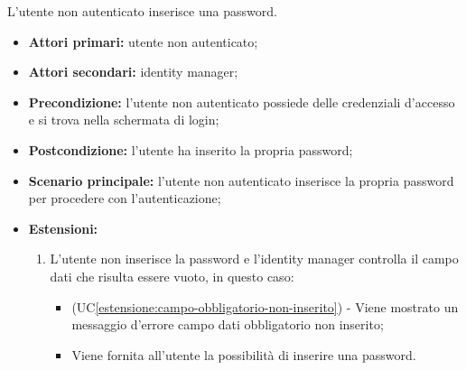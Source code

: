 \label{autenticazione-venditore.modulo.password}

L'utente non autenticato inserisce una password.
\begin{itemize}
	\item \textbf{Attori primari:} utente non autenticato;
	\item \textbf{Attori secondari:} identity manager;
	\item \textbf{Precondizione:} l'utente non autenticato possiede delle credenziali d'accesso e si trova nella schermata di login;
	\item \textbf{Postcondizione:} l'utente ha inserito la propria password;
	\item \textbf{Scenario principale:} l'utente non autenticato inserisce la propria password per procedere con l'autenticazione;
	\item \textbf{Estensioni:} 
	\begin{enumerate}[label=\lett]
		\item L'utente non inserisce la password e l'identity manager controlla il campo dati che risulta essere vuoto, in questo caso:
		\begin{itemize}
			\item (UC\ref{estensione:campo-obbligatorio-non-inserito}) - Viene mostrato un messaggio d'errore campo dati obbligatorio non inserito;
			\item Viene fornita all'utente la possibilità di inserire una password.
		\end{itemize}
	\end{enumerate}
\end{itemize}

\label{autenticazione-acquirente}


